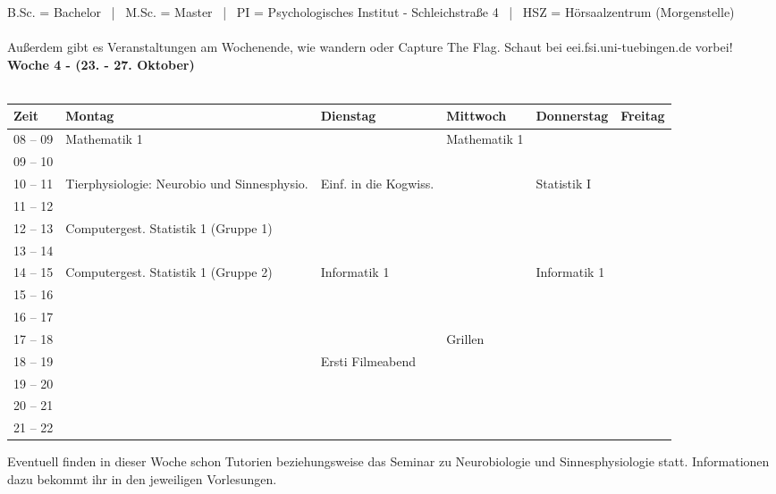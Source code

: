 \scriptsize{B.Sc. = Bachelor ~|~ M.Sc. = Master ~|~ PI = Psychologisches Institut - Schleichstraße 4 ~|~ HSZ = Hörsaalzentrum (Morgenstelle)}
\\
\\
\scriptsize{Außerdem gibt es Veranstaltungen am Wochenende, wie wandern oder Capture The Flag. Schaut bei eei.fsi.uni-tuebingen.de vorbei!}
\vfil
\textbf{Woche 4 - (23. - 27. Oktober)}\\
\\
\begin{tabular}{|l|p{}|p{}|p{}|p{}|p{}|} \hline
	Zeit & Montag & Dienstag & Mittwoch & Donnerstag & Freitag \\ 
	\hline \hline
 08 -- 09 & \footnotesize{Mathematik 1} & & \footnotesize{Mathematik 1} & & \\ \cline{1-1}
 09 -- 10 & & & & & \\ \cline{1-5}
 10 -- 11 & \footnotesize{Tierphysiologie: Neurobio und Sinnesphysio.} & \footnotesize{Einf. in die Kogwiss.} & & \footnotesize{Statistik I} & \\ \cline{1-1} 
 11 -- 12 &  &  & &  & \\ \hline
 12 -- 13 & \footnotesize{Computergest. Statistik 1 (Gruppe 1)}& & & & \\ \cline{1-1}
 13 -- 14 & & & & & \\ \hline
 14 -- 15 & \footnotesize{Computergest. Statistik 1 (Gruppe 2)} & \footnotesize{Informatik 1} & & \footnotesize{Informatik 1} & \\  \cline {1-1}
 15 -- 16 & &  & & & \\ \hline
 16 -- 17 & &  & & & \\ \cline{1-1}
 17 -- 18 & & & \scriptsize{Grillen} \cellcolor{lightlightgray}& &\\ \cline{1-1} \cline{4-4}
 18 -- 19 & &\scriptsize{Ersti Filmeabend} \cellcolor{lightlightgray} & \cellcolor{lightlightgray}& & \\ \cline{1-1}
 19 -- 20 & & \cellcolor{lightlightgray} & \cellcolor{lightlightgray} & & \\ \cline{1-1}
 20 -- 21 & & \cellcolor{lightlightgray} & \cellcolor{lightlightgray} & & \\ \cline{1-1}
 21 -- 22 & & \cellcolor{lightlightgray} & \cellcolor{lightlightgray} & & \\ \hline
\end{tabular}


\footnotesize{Eventuell finden in dieser Woche schon Tutorien beziehungsweise das Seminar zu Neurobiologie und Sinnesphysiologie statt. Informationen dazu bekommt ihr in den jeweiligen Vorlesungen.}
\normalsize
\newpage
